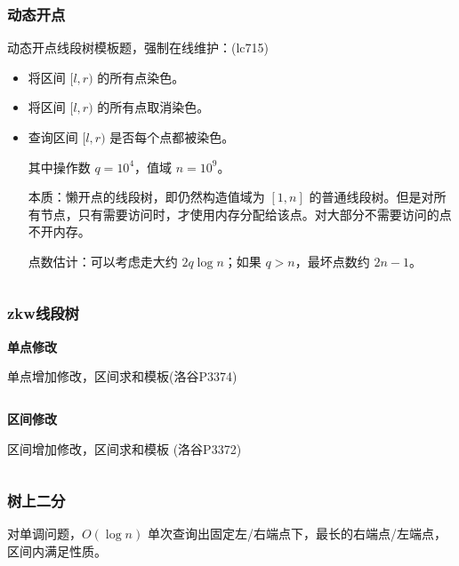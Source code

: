 \documentclass[twocolumn,10pt]{ctexart}
\makeatletter
\newcommand{\hfive}[1]{\par\addvspace{6pt}\@afterindentfalse
  {\noindent\bfseries\normalsize #1}\par\nobreak\vspace{2pt}}
\makeatother
\begin{document}
\inputminted{cpp}{code/p6242_segtree.cpp}

\subsubsection{动态开点}

动态开点线段树模板题，强制在线维护：(lc715)

\begin{itemize}
\item 将区间 $[l,r)$ 的所有点染色。
\item 将区间 $[l,r)$ 的所有点取消染色。
\item 查询区间 $[l,r)$ 是否每个点都被染色。

其中操作数 $q=10^4$，值域 $n=10^9$。

本质：懒开点的线段树，即仍然构造值域为 $[1,n]$ 的普通线段树。但是对所有节点，只有需要访问时，才使用内存分配给该点。对大部分不需要访问的点不开内存。

点数估计：可以考虑走大约 $2q\log n$；如果 $q>n$，最坏点数约 $2n-1$。
\end{itemize}

\inputminted{cpp}{code/ext_019.cpp}

\subsubsection{zkw线段树}

\hfive{单点修改}

单点增加修改，区间求和模板(洛谷P3374)

\inputminted{cpp}{code/p3374_zkw_segtree.cpp}

\hfive{区间修改}

区间增加修改，区间求和模板 (洛谷P3372)

\inputminted{cpp}{code/p3372_zkw_segtree.cpp}

\subsubsection{树上二分}

对单调问题，$O(\log n)$ 单次查询出固定左/右端点下，最长的右端点/左端点，区间内满足性质。
\end{document}
